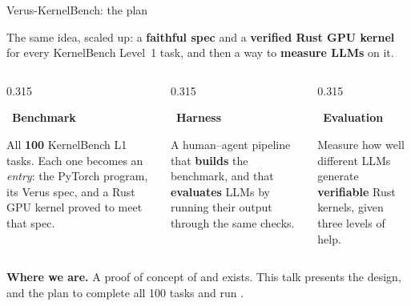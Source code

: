 \documentclass[aspectratio=169,10pt]{beamer}
\begin{document}
\begin{frame}[t]{Verus-KernelBench: the plan\byanamul}

\vspace{2pt}
{\scriptsize
The same idea, scaled up: a \textbf{faithful spec} and a \textbf{verified Rust GPU kernel} for every
KernelBench Level~1 task, and then a way to \textbf{measure LLMs} on it.\par
}

\vspace{8pt}
\begin{columns}[T]
\begin{column}{0.315\textwidth}
\begin{plancard}
\ {\small\bfseries Benchmark}\hfill{}\par\vspace{6pt}
\scriptsize\raggedright
All \textbf{100} KernelBench L1 tasks. Each one becomes an \emph{entry}: the PyTorch program,
its Verus spec, and a Rust GPU kernel proved to meet that spec.
\end{plancard}
\end{column}
\begin{column}{0.315\textwidth}
\begin{plancard}
\ {\small\bfseries Harness}\hfill{}\par\vspace{6pt}
\scriptsize\raggedright
A human--agent pipeline that \textbf{builds} the benchmark, and that \textbf{evaluates} LLMs
by running their output through the same checks.
\end{plancard}
\end{column}
\begin{column}{0.315\textwidth}
\begin{plancard}
\ {\small\bfseries Evaluation}\hfill{}\par\vspace{6pt}
\scriptsize\raggedright
Measure how well different LLMs generate \textbf{verifiable} Rust kernels, given three
levels of help.
\end{plancard}
\end{column}
\end{columns}

\vfill
\begin{callout}[lgAccent]
\scriptsize
\textbf{Where we are.} A proof of concept of  and  exists.
This talk presents the design, and the plan to complete all 100 tasks and run .
\end{callout}
\vspace{4pt}

\end{frame}
\end{document}
